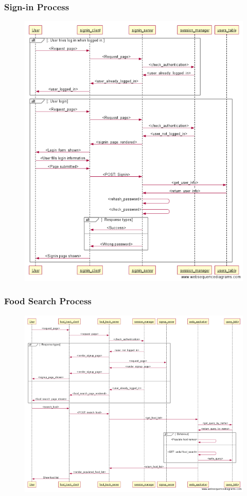 \subsubsection{Sign-in Process}
\begin{figure}[H]
\centering
\includegraphics[scale=0.70]{signin}
\end{figure}


\newpage
\subsubsection{Food Search Process}
\begin{figure}[H]
\centering
\includegraphics[scale=0.70]{search_food}
\end{figure}




